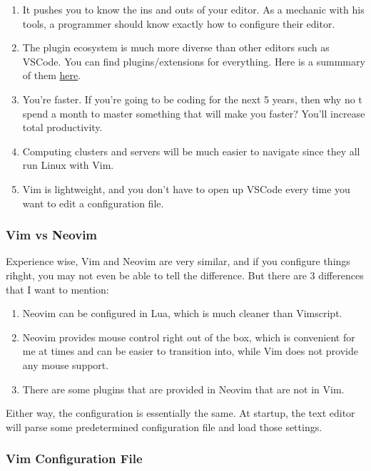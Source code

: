 \documentclass{article}
\theoremstyle{definition}
\begin{document}
    \begin{enumerate}
      \item It pushes you to know the ins and outs of your editor. As a mechanic with his tools, a programmer should know exactly how to configure their editor.  
      \item The plugin ecosystem is much more diverse than other editors such as VSCode. You can find plugins/extensions for everything. Here is a summmary of them \href{https://github.com/rockerBOO/awesome-neovim\#neovim-lua-development}{here}. 
      \item You're faster. If you're going to be coding for the next 5 years, then why no t spend a month to master something that will make you faster? You'll increase total productivity. 
      \item Computing clusters and servers will be much easier to navigate since they all run Linux with Vim. 
      \item Vim is lightweight, and you don't have to open up VSCode every time you want to edit a configuration file.  
    \end{enumerate}
  
    \subsubsection{Vim vs Neovim}

      Experience wise, Vim and Neovim are very similar, and if you configure things rihght, you may not even be able to tell the difference. But there are 3 differences that I want to mention: 
      
      \begin{enumerate}
        \item Neovim can be configured in Lua, which is much cleaner than Vimscript. 
        \item Neovim provides mouse control right out of the box, which is convenient for me at times and can be easier to transition into, while Vim does not provide any mouse support. 
        \item There are some plugins that are provided in Neovim that are not in Vim. 
      \end{enumerate}

      Either way, the configuration is essentially the same. At startup, the text editor will parse some predetermined configuration file and load those settings. 

    \subsubsection{Vim Configuration File}
\end{document}
